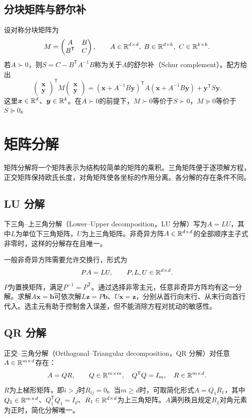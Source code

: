 \subsection{分块矩阵与舒尔补}
设对称分块矩阵为
\begin{equation}
 M=\begin{pmatrix}A&B\\B^{\mathsf T}&C\end{pmatrix},\qquad
 A\in\mathbb{R}^{d\times d},\ B\in\mathbb{R}^{d\times k},\ C\in\mathbb{R}^{k\times k}.
\end{equation}
若$A\succ0$，则$S=C-B^{\mathsf T}A^{-1}B$称为关于$A$的舒尔补（Schur complement）。配方给出
\begin{equation}
 \begin{pmatrix}\bm x\\\bm y\end{pmatrix}^{\mathsf T}M
 \begin{pmatrix}\bm x\\\bm y\end{pmatrix}
 =(\bm x+A^{-1}B\bm y)^{\mathsf T}A(\bm x+A^{-1}B\bm y)+\bm y^{\mathsf T}S\bm y.
\end{equation}
这里$\bm x\in\mathbb{R}^d$、$\bm y\in\mathbb{R}^k$。在$A\succ0$的前提下，$M\succ0$等价于$S\succ0$，$M\succeq0$等价于$S\succeq0$。

\section{矩阵分解}
矩阵分解将一个矩阵表示为结构较简单的矩阵的乘积。三角矩阵便于逐项解方程，正交矩阵保持欧氏长度，对角矩阵使各坐标的作用分离。各分解的存在条件不同。

\subsection{LU 分解}
下三角--上三角分解（Lower--Upper decomposition，LU 分解）写为$A=LU$，其中$L$为单位下三角矩阵，$U$为上三角矩阵。非奇异方阵$A\in\mathbb{R}^{d\times d}$的全部顺序主子式非零时，这样的分解存在且唯一。

一般非奇异方阵需要允许交换行，形式为
\begin{equation}
 PA=LU,\qquad P,L,U\in\mathbb{R}^{d\times d}.
\end{equation}
$P$为置换矩阵，满足$P^{-1}=P^{\mathsf T}$。通过选择非零主元，任意非奇异方阵均有这一分解。求解$A\bm x=\bm b$可依次解$L\bm z=P\bm b$、$U\bm x=\bm z$，分别从首行向末行、从末行向首行代入。选主元有助于控制舍入误差，但不能消除方程对扰动的敏感性。

\subsection{QR 分解}
正交--三角分解（Orthogonal--Triangular decomposition，QR 分解）对任意$A\in\mathbb{R}^{m\times d}$存在：
\begin{equation}
 A=QR,\qquad Q\in\mathbb{R}^{m\times m},\quad Q^{\mathsf T}Q=I_m,\quad R\in\mathbb{R}^{m\times d}.
\end{equation}
$R$为上梯形矩阵，即$i>j$时$R_{ij}=0$。当$m\geq d$时，可取简化形式$A=Q_1R_1$，其中$Q_1\in\mathbb{R}^{m\times d}$、$Q_1^{\mathsf T}Q_1=I_d$、$R_1\in\mathbb{R}^{d\times d}$为上三角矩阵。$A$满列秩且规定$R_1$对角元素为正时，简化分解唯一。

